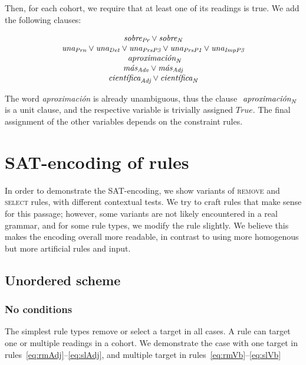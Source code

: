 Then, for each cohort, we require that at least one of its readings is true. We add the following clauses:

\begin{equation}
\begin{array}{c}
\sobrePr \vee \sobreN \\
\unaPrn \vee \unaDet \vee \unaPrsPThree \vee \unaPrsPOne \vee \unaImp \\
\aproximacionN \\
\masAdv \vee \masAdj \\
\cientificaAdj \vee \cientificaN \\
\end{array}
\end{equation}

The word \emph{aproximación} is already unambiguous, thus the clause $\text{ \em aproximaci\'{o}n}_{\text{\em N}}$ is a unit clause, and the respective variable is trivially assigned $True$. 
The final assignment of the other variables depends on the constraint rules.

\section{SAT-encoding of rules}

In order to demonstrate the SAT-encoding, we show variants of \textsc{remove} and \textsc{select} rules, with different contextual tests. 
We try to craft rules that make sense for this passage; however, some variants are not likely encountered in a real grammar, and for some rule types, we modify the rule slightly. We believe this makes the encoding overall more readable, in contrast to using more homogenous but more artificial rules and input.


\subsection{Unordered scheme}



\subsubsection{No conditions} 

The simplest rule types remove or select a target in all cases. 
A rule can target one or multiple readings in a cohort. We demonstrate the case with one target in rules~\ref{eq:rmAdj}--\ref{eq:slAdj}, and multiple target in rules~\ref{eq:rmVb}--\ref{eq:slVb}


